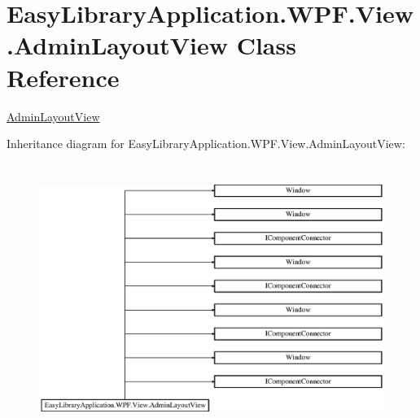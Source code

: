 \hypertarget{class_easy_library_application_1_1_w_p_f_1_1_view_1_1_admin_layout_view}{}\section{Easy\+Library\+Application.\+W\+P\+F.\+View.\+Admin\+Layout\+View Class Reference}
\label{class_easy_library_application_1_1_w_p_f_1_1_view_1_1_admin_layout_view}


\mbox{\hyperlink{class_easy_library_application_1_1_w_p_f_1_1_view_1_1_admin_layout_view}{Admin\+Layout\+View}}  


Inheritance diagram for Easy\+Library\+Application.\+W\+P\+F.\+View.\+Admin\+Layout\+View\+:\begin{figure}[H]
\begin{center}
\leavevmode
\includegraphics[height=8.750000cm]{class_easy_library_application_1_1_w_p_f_1_1_view_1_1_admin_layout_view}
\end{center}
\end{figure}
